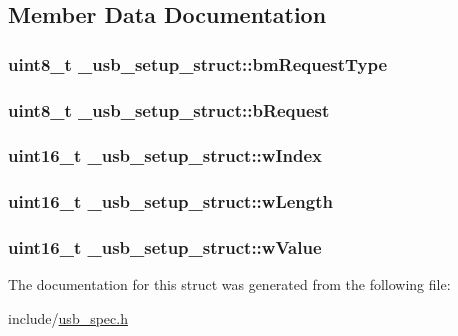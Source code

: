 \subsection{Member Data Documentation}
\hypertarget{struct__usb__setup__struct_a046235551b5e7ed60f883c8787e41cda}{
\subsubsection[{bm\-Request\-Type}]{\setlength{\rightskip}{0pt plus 5cm}uint8\-\_\-t \-\_\-usb\-\_\-setup\-\_\-struct\-::bm\-Request\-Type}}\label{struct__usb__setup__struct_a046235551b5e7ed60f883c8787e41cda}
\hypertarget{struct__usb__setup__struct_ab42c93dd57c8237b0375d5f2d318048c}{
\subsubsection[{b\-Request}]{\setlength{\rightskip}{0pt plus 5cm}uint8\-\_\-t \-\_\-usb\-\_\-setup\-\_\-struct\-::b\-Request}}\label{struct__usb__setup__struct_ab42c93dd57c8237b0375d5f2d318048c}
\hypertarget{struct__usb__setup__struct_a90bd23714ef7a57ef8a1bda38f2f26cf}{
\subsubsection[{w\-Index}]{\setlength{\rightskip}{0pt plus 5cm}uint16\-\_\-t \-\_\-usb\-\_\-setup\-\_\-struct\-::w\-Index}}\label{struct__usb__setup__struct_a90bd23714ef7a57ef8a1bda38f2f26cf}
\hypertarget{struct__usb__setup__struct_ac94c97a6091feb75aee54a7b0906b138}{
\subsubsection[{w\-Length}]{\setlength{\rightskip}{0pt plus 5cm}uint16\-\_\-t \-\_\-usb\-\_\-setup\-\_\-struct\-::w\-Length}}\label{struct__usb__setup__struct_ac94c97a6091feb75aee54a7b0906b138}
\hypertarget{struct__usb__setup__struct_af9854cf49281f21bd5371e2c77b97b90}{
\subsubsection[{w\-Value}]{\setlength{\rightskip}{0pt plus 5cm}uint16\-\_\-t \-\_\-usb\-\_\-setup\-\_\-struct\-::w\-Value}}\label{struct__usb__setup__struct_af9854cf49281f21bd5371e2c77b97b90}


The documentation for this struct was generated from the following file\-:\begin{DoxyCompactItemize}
\item 
include/\hyperlink{usb__spec_8h}{usb\-\_\-spec.\-h}\end{DoxyCompactItemize}
